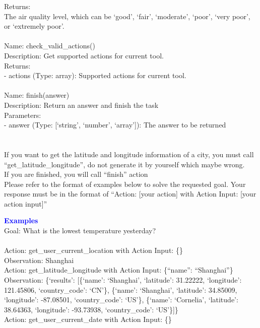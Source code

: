 \begin{tcolorbox}[breakable,title=Prompt Details for Weather]
Returns:\\
The air quality level, which can be `good', `fair', `moderate', `poor', `very poor', or `extremely poor'.\\
\\
Name: check\_valid\_actions()\\
Description: Get supported actions for current tool.\\
Returns:\\
- actions (Type: array): Supported actions for current tool.\\
\\
Name: finish(answer)\\
Description: Return an answer and finish the task\\
Parameters:\\
- answer (Type: [`string', `number', `array']): The answer to be returned\\
\\
\\
If you want to get the latitude and longitude information of a city, you must call ``get\_latitude\_longitude'', do not generate it by yourself which maybe wrong.\\
If you are finished, you will call ``finish'' action\\
Please refer to the format of examples below to solve the requested goal. Your response must be in the format of ``Action: [your action] with Action Input: [your action input]''\\
\textbf{\textcolor{blue}{Examples}}\\
Goal: What is the lowest temperature yesterday?\\
\\
Action: get\_user\_current\_location with Action Input: \{\}\\
Observation: Shanghai\\
Action: get\_latitude\_longitude with Action Input: \{``name'': ``Shanghai''\}\\
Observation: \{`results': [\{`name': `Shanghai', `latitude': 31.22222, `longitude': 121.45806, `country\_code': `CN'\}, \{`name': `Shanghai', `latitude': 34.85009, `longitude': -87.08501, `country\_code': `US'\}, \{`name': `Cornelia', `latitude': 38.64363, `longitude': -93.73938, `country\_code': `US'\}]\}\\
Action: get\_user\_current\_date with Action Input: \{\}\\

\end{tcolorbox}
